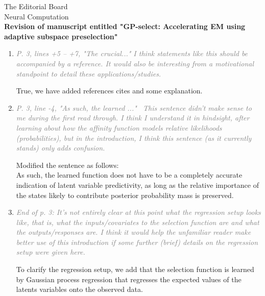 \documentclass[10pt]{letter}
\newcommand{\rvr}[1]{\textcolor{gray}{#1}}
\newcommand{\rev}[1]{\textcolor{blue}{#1}}
\begin{document}
\begin{letter}{
The Editorial Board\\
Neural Computation\\
\vspace{10mm}
\textbf{Revision of manuscript entitled "GP-select: Accelerating EM using adaptive
subspace preselection"}
}
\begin{enumerate}[topsep=3pt,itemsep=2ex,partopsep=1ex,parsep=1ex]
We have added illustrative examples to the introduction in order to provide an early intuition for the used approach. We also motivate sparsity with two examples in Sec. 5.1 as suggested, provided more explanation to Sec. 5.3, and added pointers to potential application domains / typical tasks in introduction and Sec. 5.1. We agree that providing such examples and their task context makes our motivation clearer, and believe that our changes have improved the manuscript accordingly.
    
    \item \rvr{\emph{P. 3, lines +5 -- +7, "The crucial..."  I think statements like this should be accompanied by a reference. It would also be interesting from a motivational standpoint to detail these applications/studies.}}

True, we have added references cites and some explanation.

    \item \rvr{\emph{P. 3, line -4, "As such, the learned ..."  This sentence didn’t make sense to me during the first read through. I think I understand it in hindsight, after learning about how the affinity function models relative likelihoods (probabilities), but in the introduction, I think this sentence (as it currently stands) only adds confusion.}}

Modified the sentence as follows: \\
As such, the learned function does not have to be a completely accurate
indication of latent variable predictivity, as long as the relative importance of the states
likely to contribute posterior probability mass is preserved.

    \item \rvr{\emph{End of p. 3: It's not entirely clear at this point what the regression setup looks like, that is, what the inputs/covariates to the selection function are and what the outputs/responses are. I think it would help the unfamiliar reader make better use of this introduction if some further (brief) details on the regression setup were given here.}}

To clarify the regression setup, we add that the selection function is learned by Gaussian process regression that regresses the expected values of the latents variables onto the observed data.


\end{enumerate}
\end{letter}
\end{document}
